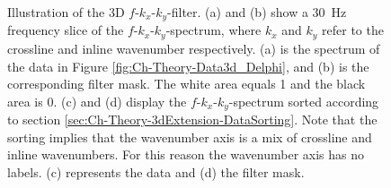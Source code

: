 \begin{figure}
	\caption{Illustration of the 3D $f$-$k_x$-$k_y$-filter. (a) and (b) show a \SI{30}{\hertz} frequency slice of the $f$-$k_x$-$k_y$-spectrum, where $k_x$ and $k_y$ refer to the crossline and inline wavenumber respectively. (a) is the spectrum of the data in Figure \ref{fig:Ch-Theory-Data3d_Delphi}, and (b) is the corresponding filter mask. The white area equals 1 and the black area is 0. (c) and (d) display the $f$-$k_x$-$k_y$-spectrum sorted according to section \ref{sec:Ch-Theory-3dExtension-DataSorting}.  Note that the sorting implies that the wavenumber axis is a mix of crossline and inline wavenumbers. For this reason the wavenumber axis has no labels. (c) represents the data and (d) the filter mask.}
	\label{fig:Ch-Theory-FKK-Mask}

\end{figure}

















